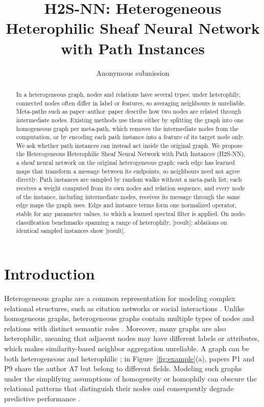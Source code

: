 \documentclass{article}
\title{H2S-NN: Heterogeneous Heterophilic Sheaf Neural Network with Path Instances}
\author{
    Anonymous submission
}
\newcommand{\method}{\textsc{H2S-NN}}
\newcommand{\res}{{\scriptsize[result]}}
\begin{document}
\maketitle

\begin{abstract}
In a heterogeneous graph, nodes and relations have several types; under heterophily, connected nodes often differ in label or features, so averaging neighbours is unreliable. Meta-paths such as paper--author--paper describe how two nodes are related through intermediate nodes. Existing methods use them either by splitting the graph into one homogeneous graph per meta-path, which removes the intermediate nodes from the computation, or by encoding each path instance into a feature of its target node only. We ask whether path instances can instead act inside the original graph. We propose the Heterogeneous Heterophilic Sheaf Neural Network with Path Instances (\method{}), a sheaf neural network on the original heterogeneous graph: each edge has learned maps that transform a message between its endpoints, so neighbours need not agree directly. Path instances are sampled by random walks without a meta-path list; each receives a weight computed from its own nodes and relation sequence, and every node of the instance, including intermediate nodes, receives its message through the same edge maps the graph uses. Edge and instance terms form one normalized operator, stable for any parameter values, to which a learned spectral filter is applied. On node-classification benchmarks spanning a range of heterophily, \res{}; ablations on identical sampled instances show \res{}.
\end{abstract}

\section{Introduction}
\label{sec:introduction}

Heterogeneous graphs are a common representation for modeling complex relational structures, such as citation networks \cite{liu2014meta} or social interactions \cite{singh2025overview}. Unlike homogeneous graphs, heterogeneous graphs contain multiple types of nodes and relations with distinct semantic roles \cite{sun2013mining}. Moreover, many graphs are also heterophilic, meaning that adjacent nodes may have different labels or attributes, which makes similarity-based neighbor aggregation unreliable. A graph can be both heterogeneous and heterophilic \cite{lin2025heterophily}; in Figure~\ref{fig:example}(a), papers P1 and P9 share the author A7 but belong to different fields. Modeling such graphs under the simplifying assumptions of homogeneity or homophily can obscure the relational patterns that distinguish their nodes and consequently degrade predictive performance \cite{lin2025heterophily}.
\end{document}
